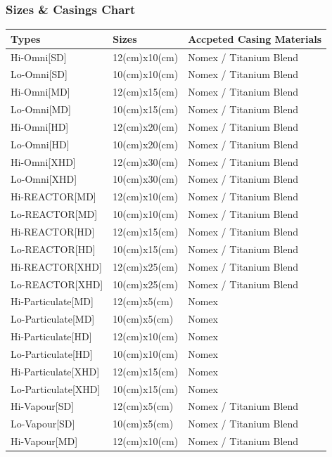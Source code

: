 \documentclass[a4paper, 12pt, oneside]{article}
\begin{document}
{			\subsubsection{Sizes \& Casings Chart}
				\begin{tabular}{|p{4cm}||p{3cm}|p{5.45cm}|}
					\hline
					Types & Sizes & Accpeted Casing Materials \\\hline
					Hi-Omni[SD] & 12(cm)x10(cm) & Nomex / Titanium Blend \\
					Lo-Omni[SD] & 10(cm)x10(cm) & Nomex / Titanium Blend \\
					Hi-Omni[MD] & 12(cm)x15(cm) & Nomex / Titanium Blend \\
					Lo-Omni[MD] & 10(cm)x15(cm) & Nomex / Titanium Blend \\
					Hi-Omni[HD] & 12(cm)x20(cm) & Nomex / Titanium Blend \\
					Lo-Omni[HD] & 10(cm)x20(cm) & Nomex / Titanium Blend \\
					Hi-Omni[XHD] & 12(cm)x30(cm) & Nomex / Titanium Blend \\
					Lo-Omni[XHD] & 10(cm)x30(cm) & Nomex / Titanium Blend \\
					Hi-REACTOR[MD] & 12(cm)x10(cm) & Nomex / Titanium Blend \\
					Lo-REACTOR[MD] & 10(cm)x10(cm) & Nomex / Titanium Blend \\
					Hi-REACTOR[HD] & 12(cm)x15(cm) & Nomex / Titanium Blend \\
					Lo-REACTOR[HD] & 10(cm)x15(cm) & Nomex / Titanium Blend \\
					Hi-REACTOR[XHD] & 12(cm)x25(cm) & Nomex / Titanium Blend \\
					Lo-REACTOR[XHD] & 10(cm)x25(cm) & Nomex / Titanium Blend \\
					Hi-Particulate[MD] & 12(cm)x5(cm) & Nomex \\
					Lo-Particulate[MD] & 10(cm)x5(cm) & Nomex \\
					Hi-Particulate[HD] & 12(cm)x10(cm) & Nomex \\
					Lo-Particulate[HD] & 10(cm)x10(cm) & Nomex \\
					Hi-Particulate[XHD] & 12(cm)x15(cm) & Nomex \\
					Lo-Particulate[XHD] & 10(cm)x15(cm) & Nomex \\
					Hi-Vapour[SD] & 12(cm)x5(cm) & Nomex / Titanium Blend \\
					Lo-Vapour[SD] & 10(cm)x5(cm) & Nomex / Titanium Blend \\
					Hi-Vapour[MD] & 12(cm)x10(cm) & Nomex / Titanium Blend \\

\end{tabular}}
\end{document}
